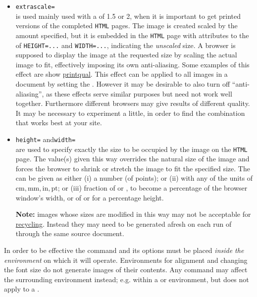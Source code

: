 \begin{itemize}
%
\item \texttt{extrascale=}\\
is used mainly used with a  of 1.5 or 2, when it is 
important to get printed versions of the completed \texttt{HTML} pages. 
The image is created scaled by the amount specified, but it is embedded 
in the \texttt{HTML} page with attributes to the  of
\texttt{HEIGHT=...} and \texttt{WIDTH=...}, 
indicating the \emph{unscaled} size. 
A browser is supposed to display the image at the requested size
by scaling the actual image to fit, 
effectively imposing its own anti-aliasing.
Some examples of this effect are show 
\hyperref{here}{later, in Section~}{}{printqual}.
This effect can be applied to all images in a document by setting
the  .
However it may be desirable to also turn off ``anti-aliasing'', 
as these effects serve similar purposes but need not work well together. 
Furthermore different browsers may give results of different quality.
It may be necessary to experiment a little,
in order to find the combination that works best at your site.

%
\item \texttt{height=}\quad
 and\quad\texttt{width=}\\
are used to specify exactly the size to be occupied by the image
on the \texttt{HTML} page. The value(s) given this way overrides
the natural size of the image and forces the browser to shrink or
stretch the image to fit the specified size.
The  can be given as either (i) a number (of points);
or (ii) with any of the units of $\mathrm{cm, mm, in, pt}$;
or (iii) fraction of  or ,
to become a percentage of the browser window's width,
or of  or  for a percentage height.

\noindent
\textbf{Note:} images whose sizes are modified in this way may not 
be acceptable for 
\hyperref{image-recycling}{image-recycling, (see page~}{)}{recycling}. 
Instead they may need to be generated afresh on each run of \latextohtml{} 
through the same source document.
%
\end{itemize}

\medskip\noindent
In order to be effective the  command 
and its options must be placed \emph{inside the environment} 
on which it will operate.
Environments for alignment and changing the font size do not
generate images of their contents. Any 
command may affect the surrounding environment instead;
e.g. within a  or  environment,
but does not apply to a .


